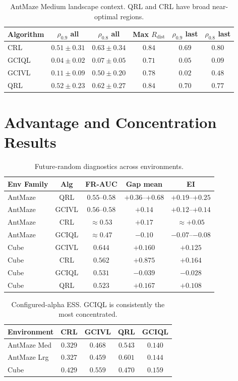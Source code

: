 \documentclass[11pt]{article}
\newcommand{\Rdist}{R_{\mathrm{dist}}}
\begin{document}
\begin{table}[htb]
\centering
\small
\renewcommand{\arraystretch}{1.1}
\begin{tabular}{lccccc}
\toprule
Algorithm & $\rho_{0.9}$ all & $\rho_{0.8}$ all & Max $\Rdist$ & $\rho_{0.9}$ last & $\rho_{0.8}$ last \\
\midrule
CRL   & $0.51\pm0.31$ & $0.63\pm0.34$ & $0.84$ & $0.69$ & $0.80$ \\
GCIQL & $0.04\pm0.02$ & $0.07\pm0.05$ & $0.71$ & $0.05$ & $0.09$ \\
GCIVL & $0.11\pm0.09$ & $0.50\pm0.20$ & $0.78$ & $0.02$ & $0.48$ \\
QRL   & $0.52\pm0.23$ & $0.62\pm0.27$ & $0.84$ & $0.70$ & $0.77$ \\
\bottomrule
\end{tabular}
\caption{AntMaze Medium landscape context. QRL and CRL have broad near-optimal regions.}
\end{table}

\section{Advantage and Concentration Results}

\begin{table}[htb]
\centering
\small
\renewcommand{\arraystretch}{1.1}
\begin{tabular}{lcccc}
\toprule
Env Family & Alg & FR-AUC & Gap mean & EI \\
\midrule
AntMaze & QRL   & $0.55$--$0.58$ & $+0.36$--$+0.68$ & $+0.19$--$+0.25$ \\
AntMaze & GCIVL & $0.56$--$0.58$ & $+0.14$ & $+0.12$--$+0.14$ \\
AntMaze & CRL   & $\approx0.53$ & $+0.17$ & $\approx+0.05$ \\
AntMaze & GCIQL & $\approx0.47$ & $-0.10$ & $-0.07$--$-0.08$ \\
\midrule
Cube & GCIVL & $0.644$ & $+0.160$ & $+0.125$ \\
Cube & CRL   & $0.562$ & $+0.875$ & $+0.164$ \\
Cube & GCIQL & $0.531$ & $-0.039$ & $-0.028$ \\
Cube & QRL   & $0.523$ & $+0.167$ & $+0.108$ \\
\bottomrule
\end{tabular}
\caption{Future-random diagnostics across environments.}
\end{table}

\begin{table}[htb]
\centering
\small
\renewcommand{\arraystretch}{1.1}
\begin{tabular}{lcccc}
\toprule
Environment & CRL & GCIVL & QRL & GCIQL \\
\midrule
AntMaze Med & $0.329$ & $0.468$ & $0.543$ & $0.140$ \\
AntMaze Lrg & $0.327$ & $0.459$ & $0.601$ & $0.144$ \\
Cube        & $0.429$ & $0.559$ & $0.470$ & $0.159$ \\
\bottomrule
\end{tabular}
\caption{Configured-alpha ESS. GCIQL is consistently the most concentrated.}
\end{table}
\end{document}

